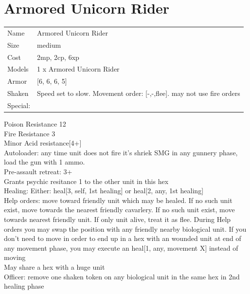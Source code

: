 \clearpage

\section{ Armored Unicorn Rider }

\begin{tabular}{ll}
  Name & Armored Unicorn Rider \\
  Size & medium\\
  Cost & 2mp, 2cp, 6xp\\
  Models & 1 x Armored Unicorn Rider\\
  Armor & [6, 6, 6, 5]\\
  Shaken & Speed set to slow. Movement order: [-,-,flee]. may not use fire orders\\
  Special: \\
\end{tabular}

\noindent Poison Resistance 12\\ 
Fire Resistance 3\\ 
Minor Acid resistance[4+]\\ 
Autoloader: any time unit does not fire it's shriek SMG in any gunnery phase, load the gun with 1 ammo.\\ 
Pre-assault retreat: 3+\\ 
Grants psychic resitance 1 to the other unit in this hex\\ 
Healing: Either: heal[3, self, 1st healing] or heal[2, any, 1st healing]\\ 
Help orders: move toward friendly unit which may be healed. If no such unit exist, move towards the nearest friendly cavarlery. If no such unit exist, move towards nearest friendly unit. If only unit alive, treat it as flee. During Help orders you may swap the position with any friendly nearby biological unit. If you don't need to move in order to end up in a hex with an wounded unit at end of any movement phase, you may execute an heal[1, any, movement X] instead of moving\\ 
May share a hex with a huge unit\\ 
Officer: remove one shaken token on any biological unit in the same hex in 2nd healing  phase\\ 


